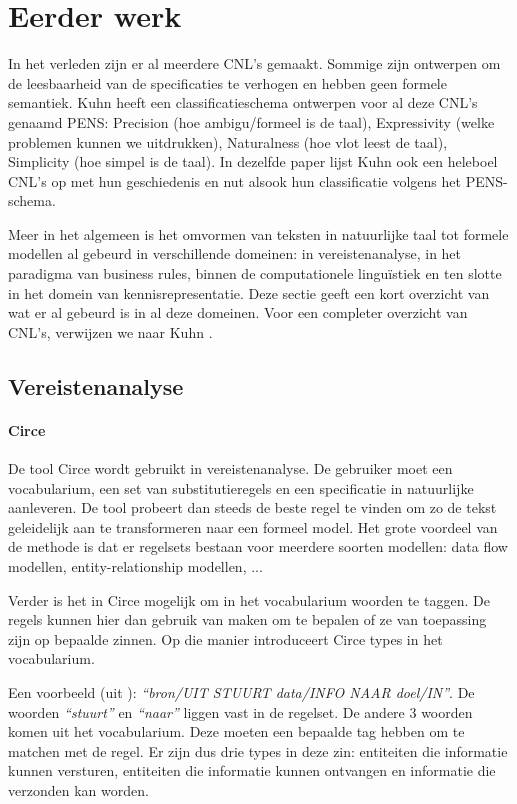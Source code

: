 \documentclass[]{article}
\theoremstyle{definition}
\newcommand{\example}[1]{\textit{``#1''}}
\begin{document}
\section{Eerder werk}
In het verleden zijn er al meerdere CNL's gemaakt. Sommige zijn ontwerpen om de leesbaarheid van de specificaties te verhogen en hebben geen formele semantiek. Kuhn heeft een classificatieschema ontwerpen voor al deze CNL's \cite{Kuhn2014} genaamd PENS: Precision (hoe ambigu/formeel is de taal), Expressivity (welke problemen kunnen we uitdrukken), Naturalness (hoe vlot leest de taal), Simplicity (hoe simpel is de taal). In dezelfde paper lijst Kuhn ook een heleboel CNL's op met hun geschiedenis en nut alsook hun classificatie volgens het PENS-schema.

Meer in het algemeen is het omvormen van teksten in natuurlijke taal tot formele modellen al gebeurd in verschillende domeinen: in vereistenanalyse, in het paradigma van business rules, binnen de computationele linguïstiek en ten slotte in het domein van kennisrepresentatie. Deze sectie geeft een kort overzicht van wat er al gebeurd is in al deze domeinen. Voor een completer overzicht van CNL's, verwijzen we naar Kuhn \cite{Kuhn2014}.

\subsection{Vereistenanalyse}
\paragraph{Circe} De tool Circe \cite{Ambriola1997} wordt gebruikt in vereistenanalyse. De gebruiker moet een vocabularium, een set van substitutieregels en een specificatie in natuurlijke aanleveren. De tool probeert dan steeds de beste regel te vinden om zo de tekst geleidelijk aan te transformeren naar een formeel model. Het grote voordeel van de methode is dat er regelsets bestaan voor meerdere soorten modellen: data flow modellen, entity-relationship modellen, ...

Verder is het in Circe mogelijk om in het vocabularium woorden te taggen. De regels kunnen hier dan gebruik van maken om te bepalen of ze van toepassing zijn op bepaalde zinnen. Op die manier introduceert Circe types in het vocabularium.

Een voorbeeld (uit \cite{Ambriola1997}): \example{bron/UIT STUURT data/INFO NAAR doel/IN}. De woorden \example{stuurt} en \example{naar} liggen vast in de regelset. De andere 3 woorden komen uit het vocabularium. Deze moeten een bepaalde tag hebben om te matchen met de regel. Er zijn dus drie types in deze zin: entiteiten die informatie kunnen versturen, entiteiten die informatie kunnen ontvangen en informatie die verzonden kan worden.
\end{document}
